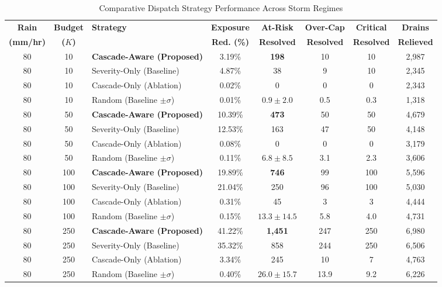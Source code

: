 \documentclass[12pt,a4paper]{report}
\begin{document}
\begin{table}[h!]
\centering
\caption{Comparative Dispatch Strategy Performance Across Storm Regimes}
\label{tab:experimental_summary}
\fontsize{8pt}{10pt}\selectfont
\begin{tabular}{|c|c|l|c|c|c|c|c|}
\hline
\textbf{Rain} & \textbf{Budget} & \textbf{Strategy} & \textbf{Exposure} & \textbf{At-Risk} & \textbf{Over-Cap} & \textbf{Critical} & \textbf{Drains} \\
\textbf{(mm/hr)} & \textbf{($K$)} & & \textbf{Red. (\%)} & \textbf{Resolved} & \textbf{Resolved} & \textbf{Resolved} & \textbf{Relieved} \\
\hline
80 & 10 & \textbf{Cascade-Aware (Proposed)} & 3.19\% & \textbf{198} & 10 & 10 & 2,987 \\
80 & 10 & Severity-Only (Baseline) & 4.87\% & 38 & 9 & 10 & 2,345 \\
80 & 10 & Cascade-Only (Ablation) & 0.02\% & 0 & 0 & 0 & 2,343 \\
80 & 10 & Random (Baseline $\pm \sigma$) & 0.01\% & $0.9 \pm 2.0$ & 0.5 & 0.3 & 1,318 \\
\hline
80 & 50 & \textbf{Cascade-Aware (Proposed)} & 10.39\% & \textbf{473} & 50 & 50 & 4,679 \\
80 & 50 & Severity-Only (Baseline) & 12.53\% & 163 & 47 & 50 & 4,148 \\
80 & 50 & Cascade-Only (Ablation) & 0.08\% & 0 & 0 & 0 & 3,179 \\
80 & 50 & Random (Baseline $\pm \sigma$) & 0.11\% & $6.8 \pm 8.5$ & 3.1 & 2.3 & 3,606 \\
\hline
80 & 100 & \textbf{Cascade-Aware (Proposed)} & 19.89\% & \textbf{746} & 99 & 100 & 5,596 \\
80 & 100 & Severity-Only (Baseline) & 21.04\% & 250 & 96 & 100 & 5,030 \\
80 & 100 & Cascade-Only (Ablation) & 0.31\% & 45 & 3 & 3 & 4,444 \\
80 & 100 & Random (Baseline $\pm \sigma$) & 0.15\% & $13.3 \pm 14.5$ & 5.8 & 4.0 & 4,731 \\
\hline
80 & 250 & \textbf{Cascade-Aware (Proposed)} & 41.22\% & \textbf{1,451} & 247 & 250 & 6,980 \\
80 & 250 & Severity-Only (Baseline) & 35.32\% & 858 & 244 & 250 & 6,506 \\
80 & 250 & Cascade-Only (Ablation) & 3.34\% & 245 & 10 & 7 & 4,763 \\
80 & 250 & Random (Baseline $\pm \sigma$) & 0.40\% & $26.0 \pm 15.7$ & 13.9 & 9.2 & 6,226 \\

\end{tabular}
\end{table}
\end{document}
